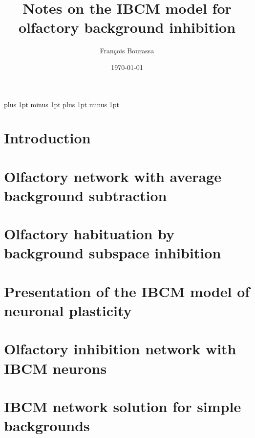 \documentclass[letter, 12pt]{article}
\title{Notes on the IBCM model for olfactory background inhibition}
\author{François Bourassa}
\date{\today}
\begin{document}
\maketitle

{\parskip=1pt plus 1pt minus 1pt
\tableofcontents
}
\parskip=12pt plus 1pt minus 1pt

\section{Introduction}
\label{sect:introduction}



\section{Olfactory network with average background subtraction}
\label{sect:basic_model}



\section{Olfactory habituation by background subspace inhibition}
\label{sect:inhib_network}



\section{Presentation of the IBCM model of neuronal plasticity}
\label{sect:ibcm}



\section{Olfactory inhibition network with IBCM neurons}
\label{sect:ibcm_inhibition}


\section{IBCM network solution for simple backgrounds}
\label{sect:ibcm_simple_examples}



\end{document}
